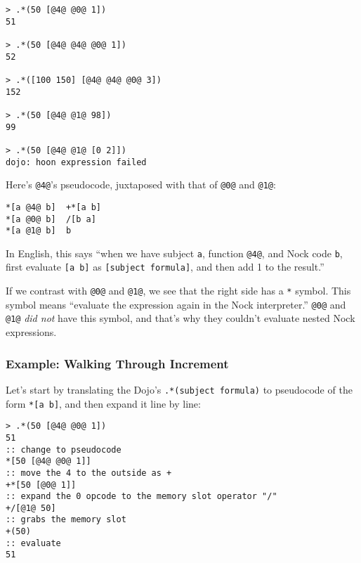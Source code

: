 \documentclass[twoside]{article}
\begin{document}
\begin{lstlisting}[style=listingcode]
> .*(50 [@4@ @0@ 1])
51

> .*(50 [@4@ @4@ @0@ 1])
52

> .*([100 150] [@4@ @4@ @0@ 3])
152

> .*(50 [@4@ @1@ 98])
99

> .*(50 [@4@ @1@ [0 2]])
dojo: hoon expression failed
\end{lstlisting}

Here's \lstinline[style=inlinecode]{@4@}'s pseudocode, juxtaposed with that of \lstinline[style=inlinecode]{@0@} and \lstinline[style=inlinecode]{@1@}:

\begin{lstlisting}[style=listingcode]
*[a @4@ b]  +*[a b]
*[a @0@ b]  /[b a]
*[a @1@ b]  b
\end{lstlisting}

In English, this says “when we have subject \lstinline[style=inlinecode]{a}, function \lstinline[style=inlinecode]{@4@}, and Nock code \lstinline[style=inlinecode]{b}, first evaluate \lstinline[style=inlinecode]{[a b]} as \lstinline[style=inlinecode]{[subject formula]}, and then add 1 to the result.”

If we contrast with \lstinline[style=inlinecode]{@0@} and \lstinline[style=inlinecode]{@1@}, we see that the right side has a \lstinline[style=inlinecode]{*} symbol. This symbol means “evaluate the expression again in the Nock interpreter.” \lstinline[style=inlinecode]{@0@} and \lstinline[style=inlinecode]{@1@} \emph{did not} have this symbol, and that's why they couldn't evaluate nested Nock expressions.

\subsubsection{Example:  Walking Through Increment}
  
Let's start by translating the Dojo's \lstinline[style=inlinecode]{.*(subject formula)} to pseudocode of the form \lstinline[style=inlinecode]{*[a b]}, and then expand it line by line:

\begin{lstlisting}[style=listingcode]
> .*(50 [@4@ @0@ 1])
51
:: change to pseudocode
*[50 [@4@ @0@ 1]]
:: move the 4 to the outside as +
+*[50 [@0@ 1]]
:: expand the 0 opcode to the memory slot operator "/"
+/[@1@ 50]
:: grabs the memory slot
+(50)
:: evaluate
51
\end{lstlisting}
\end{document}
